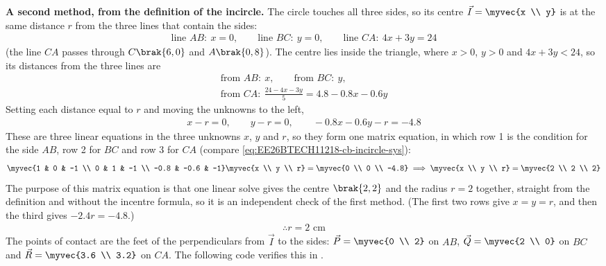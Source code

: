 \begin{enumerate}[label=\thesubsection.\arabic*, ref=\thesubsection.\theenumi,itemsep=1.5em]
\textbf{A second method, from the definition of the incircle.} The circle touches all three sides, so its centre $\vec{I}=\myvec{x \\ y}$ is at the same distance $r$ from the three lines that contain the sides:
\begin{align}
\text{line } AB: \ x=0, \qquad \text{line } BC: \ y=0, \qquad \text{line } CA: \ 4x+3y=24
\end{align}
(the line $CA$ passes through $C\brak{6,0}$ and $A\brak{0,8}$). The centre lies inside the triangle, where $x>0$, $y>0$ and $4x+3y<24$, so its distances from the three lines are
\begin{align}
\text{from } AB: \ x, \qquad \text{from } BC: \ y, \\
\text{from } CA: \ \frac{24-4x-3y}{5} = 4.8-0.8x-0.6y
\end{align}
Setting each distance equal to $r$ and moving the unknowns to the left,
\begin{align}
x - r = 0, \qquad y - r = 0, \qquad -0.8x - 0.6y - r = -4.8
\end{align}
These are three linear equations in the three unknowns $x$, $y$ and $r$, so they form one matrix equation, in which row 1 is the condition for the side $AB$, row 2 for $BC$ and row 3 for $CA$ (compare \eqref{eq:EE26BTECH11218-cb-incircle-sys}):
\begin{align}
\myvec{1 & 0 & -1 \\ 0 & 1 & -1 \\ -0.8 & -0.6 & -1}\myvec{x \\ y \\ r} = \myvec{0 \\ 0 \\ -4.8}
\implies \myvec{x \\ y \\ r} = \myvec{2 \\ 2 \\ 2}
\end{align}
The purpose of this matrix equation is that one linear solve gives the centre $\brak{2,2}$ and the radius $r=2$ together, straight from the definition and without the incentre formula, so it is an independent check of the first method. (The first two rows give $x=y=r$, and then the third gives $-2.4r=-4.8$.)
\begin{align}
\therefore r = 2 \text{ cm}
\end{align}
The points of contact are the feet of the perpendiculars from $\vec{I}$ to the sides: $\vec{P}=\myvec{0 \\ 2}$ on $AB$, $\vec{Q}=\myvec{2 \\ 0}$ on $BC$ and $\vec{R}=\myvec{3.6 \\ 3.2}$ on $CA$. The following code verifies this in .

\end{enumerate}
